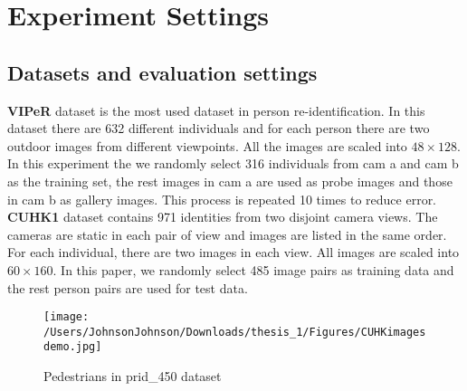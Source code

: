 \chapter{Experiment Settings}


\section{Datasets and evaluation settings}

\noindent \textbf{VIPeR} dataset is the most used dataset in person re-identification. In this dataset there are 632 different individuals and for each person there are two outdoor images from different viewpoints. All the images are scaled into $48\times128$. In this experiment the we randomly select 316 individuals from cam a and cam b as the training set, the rest images in cam a are used as probe images and those in cam b as gallery images. This process is repeated 10 times to reduce error.\\
\textbf{CUHK1} dataset contains 971 identities from two disjoint camera views. The cameras are static in each pair of view and images are listed in the same order. For each individual, there are two images in each view. All images are scaled into $60\times160$. In this paper, we randomly select 485 image pairs as training data and the rest person pairs are used for test data. 
\begin{figure}[H]
\begin{raggedleft}
\texttt{[image: /Users/JohnsonJohnson/Downloads/thesis\_1/Figures/CUHKimagesdemo.jpg]}
\vspace{-3em}
\caption{Pedestrians in prid\_450 dataset}
\end{raggedleft}
\end{figure}
